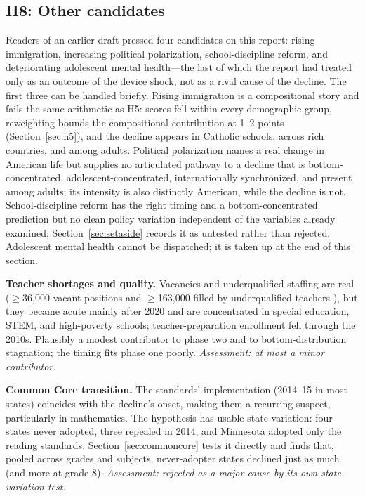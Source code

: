 \documentclass[11pt]{article}
\begin{document}
\subsection{H8: Other candidates}\label{sec:h8}

Readers of an earlier draft pressed four candidates on this report: rising immigration, increasing political polarization, school-discipline reform, and deteriorating adolescent mental health---the last of which the report had treated only as an outcome of the device shock, not as a rival cause of the decline. The first three can be handled briefly. Rising immigration is a compositional story and fails the same arithmetic as H5: scores fell within every demographic group, reweighting bounds the compositional contribution at 1--2 points (Section~\ref{sec:h5}), and the decline appears in Catholic schools, across rich countries, and among adults. Political polarization names a real change in American life but supplies no articulated pathway to a decline that is bottom-concentrated, adolescent-concentrated, internationally synchronized, and present among adults; its intensity is also distinctly American, while the decline is not. School-discipline reform has the right timing and a bottom-concentrated prediction but no clean policy variation independent of the variables already examined; Section~\ref{sec:setaside} records it as untested rather than rejected. Adolescent mental health cannot be dispatched; it is taken up at the end of this section.

\textbf{Teacher shortages and quality.} Vacancies and underqualified staffing are real ($\geq$36{,}000 vacant positions and $\geq$163{,}000 filled by underqualified teachers \citep{nguyen2024}), but they became acute mainly after 2020 and are concentrated in special education, STEM, and high-poverty schools; teacher-preparation enrollment fell through the 2010s. Plausibly a modest contributor to phase two and to bottom-distribution stagnation; the timing fits phase one poorly. \emph{Assessment: at most a minor contributor.}

\textbf{Common Core transition.} The standards' implementation (2014--15 in most states) coincides with the decline's onset, making them a recurring suspect, particularly in mathematics. The hypothesis has usable state variation: four states never adopted, three repealed in 2014, and Minnesota adopted only the reading standards. Section~\ref{sec:commoncore} tests it directly and finds that, pooled across grades and subjects, never-adopter states declined just as much (and more at grade 8). \emph{Assessment: rejected as a major cause by its own state-variation test.}
\end{document}
